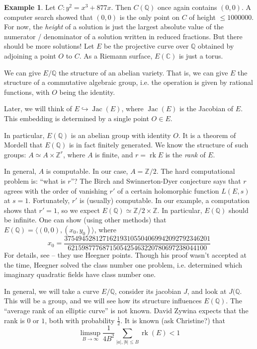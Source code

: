 \documentclass{article}
\theoremstyle{definition}
\newtheorem{example}[subsection]{Example}
\begin{document}
\begin{example}
Let $C:y^2=x^3+877 x$. Then $C(\mathbb{Q})$ once again contains $(0,0)$. A 
computer search showed that $(0,0)$ is the only point on $C$ of height 
$\leqslant 1000000$. For now, the \emph{height} of a solution is just the 
largest absolute value of the numerator / denominator of a solution written 
in reduced fractions. But there should be more solutions! Let $E$ be the 
projective curve over $\mathbb{Q}$ obtained by adjoining a point $O$ to $C$. 
As a Riemann surface, $E(\mathbb{C})$ is just a torus. 

We can give $E/\mathbb{Q}$ the structure of an abelian variety. That is, 
we can give $E$ the structure of a commutative algebraic group, i.e. the 
operation is given by rational functions, with $O$ being the identity. 

Later, we will think of $E\hookrightarrow \operatorname{Jac}(E)$, where 
$\operatorname{Jac}(E)$ is the Jacobian of $E$. This embedding is determined 
by a single point $O\in E$. 

In particular, $E(\mathbb{Q})$ is an abelian group with identity $O$. It is 
a theorem of Mordell that $E(\mathbb{Q})$ is in fact finitely generated. We 
know the structure of such groups: $A\simeq A\times \mathbb{Z}^r$, where 
$A$ is finite, and $r=\operatorname{rk} E$ is the \emph{rank} of $E$. 

In general, $A$ is computable. In our case, $A=\mathbb{Z}/2$. The hard 
computational problem is: ``what is $r$''? The Birch and Swinnerton-Dyer 
conjecture says that $r$ agrees with the order of vanishing $r'$ of a certain 
holomorphic function $L(E,s)$ at $s=1$. Fortunately, $r'$ is (usually) 
computable. In our example, a computation shows that $r'=1$, so we expect 
$E(\mathbb{Q})\simeq \mathbb{Z}/2\times\mathbb{Z}$. In particular, 
$E(\mathbb{Q})$ should be infinite. One can show (using other methods) that 
$E(\mathbb{Q})=\langle (0,0),(x_0,y_0)\rangle$, where 
\[
  x_0 = \frac{37 5494 5281 2716 2193 1055 0406 9942 0927 9234 6201}{6215 9877 7687 1505 4254 6322 0780 6972 3804 4100}
\]
For details, see \cite{br84} -- they use Heegner points. Though his proof wasn't 
accepted at the time, Heegner solved the class number one problem, i.e. 
determined which imaginary quadratic fields have class number one. 
\end{example}

In general, we will take a curve $E/\mathbb{Q}$, consider its jacobian $J$, 
and look at $J(\mathbb{Q}$. This will be a group, and we will see how its 
structure influences $E(\mathbb{Q})$. The ``average rank of an elliptic 
curve'' is not known. David Zywina expects that the rank is $0$ or $1$, both 
with probability $\frac 1 2$. It is known (ask Christine?) that 
\[
  \limsup_{B\to\infty} \frac{1}{4 B^2} \sum_{|a|,|b|\leqslant B} \operatorname{rk}(E) < 1
\]
\end{document}
